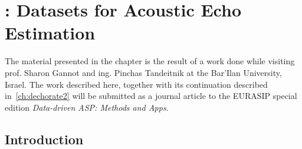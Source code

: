 \chapter{: Datasets for Acoustic Echo Estimation}\label{ch:dechorate}

\vspace{-2.5em}

 \synopsisChDechorate


\mynewline
The material presented in the chapter is the result of a work done while visiting prof. Sharon Gannot and ing. Pinchas Tandeitnik at the Bar'Ilan University, Israel.
The work described here, together with its continuation described in~\cref{ch:dechorate2} will be submitted as a journal article to the EURASIP special edition \textit{Data-driven ASP: Methods and Apps}.


\section{Introduction}\label{sec:dechorate:intro}


